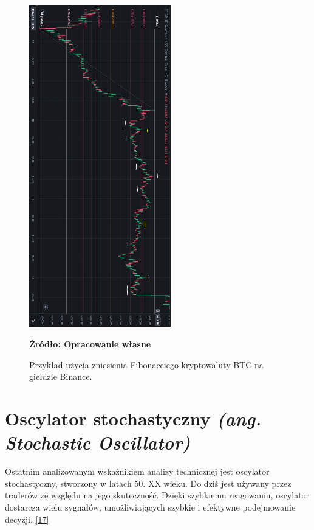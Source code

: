 \documentclass[12pt,a4paper,twoside, inzynierska]{pwr_wmat_praca_dyplomowa}
\theoremstyle{plain}
\numberwithin{theorem}{chapter}
\theoremstyle{definition}
\numberwithin{theorem}{chapter}
\begin{document}
	\vspace{12pt}
	\begin{figure}[H]
		\centering
		\includegraphics[width=0.55\textwidth]{fibo.png}
		\caption{Przykład użycia zniesienia Fibonacciego kryptowaluty BTC na giełdzie Binance.}
		\label{fig:ciagf}
		\textbf{Źródło: Opracowanie własne} 	\end{figure}
	\vspace{12pt}
	
	\section{Oscylator stochastyczny \textit{(ang. Stochastic Oscillator)}}
	Ostatnim analizowanym wskaźnikiem analizy technicznej jest oscylator stochastyczny, stworzony w latach 50. XX wieku. Do dziś jest używany przez traderów ze względu na jego skuteczność. Dzięki szybkiemu reagowaniu, oscylator dostarcza wielu sygnałów, umożliwiających szybkie i efektywne podejmowanie decyzji. \hyperref[info17]{[17]}\newline
\end{document}
